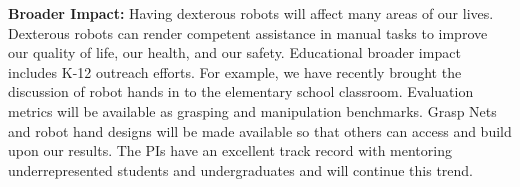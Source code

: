 {\bf Broader Impact:}
Having dexterous robots will affect many areas of our lives.   Dexterous robots can render competent assistance in manual tasks to improve our quality of life, our health, and our safety.     Educational broader impact includes K-12 outreach efforts.  For example, we have recently brought the discussion of robot hands in to the elementary school classroom.    Evaluation metrics will be available as grasping and manipulation benchmarks.   Grasp Nets and robot hand designs will be made available so that others can access and build upon our results.   The PIs have an excellent track record with mentoring underrepresented students and undergraduates and will continue this trend.


